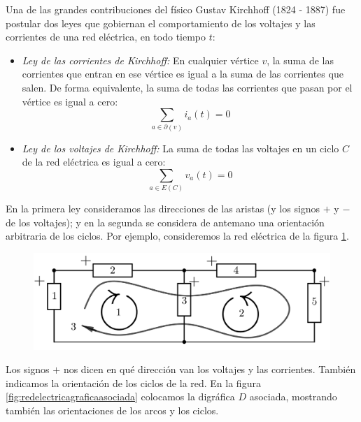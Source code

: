 Una de las grandes contribuciones del físico Gustav Kirchhoff (1824 - 1887) fue postular dos leyes que gobiernan el comportamiento de los voltajes y las corrientes de una red eléctrica, en todo tiempo $t$:

\begin{itemize}
    \item \textit{Ley de las corrientes de Kirchhoff:} En cualquier vértice $v$, la suma de las corrientes que entran en ese vértice es igual a la suma de las corrientes que salen. De forma equivalente, la suma de todas las corrientes que pasan por el vértice es igual a cero:$$ \sum_{a \in \partial(v)} i_{a}(t) = 0$$
    \item \textit{Ley de los voltajes de Kirchhoff:} La suma de todas las voltajes en un ciclo $C$ de la red eléctrica es igual a cero: $$\sum_{a \in E(C)} v_{a}(t) = 0$$
\end{itemize}

En la primera ley consideramos las direcciones de las aristas (y los signos $+$ y $-$ de los voltajes); y en la segunda se considera de antemano una orientación arbitraria de los ciclos. Por ejemplo, consideremos la red eléctrica de la figura \ref{fig:redelectrica}.

\begin{figure}[H]
    \centering
    \includegraphics[scale=0.25]{img/imgchapter4/redelectrica.jpg}
    \caption{}
    \label{fig:redelectrica}
\end{figure}

Los signos $+$ nos dicen en qué dirección van los voltajes y las corrientes. También indicamos la orientación de los ciclos de la red. En la figura \ref{fig:redelectricagraficaasociada} colocamos la digráfica $D$ asociada, mostrando también las orientaciones de los arcos y los ciclos.

